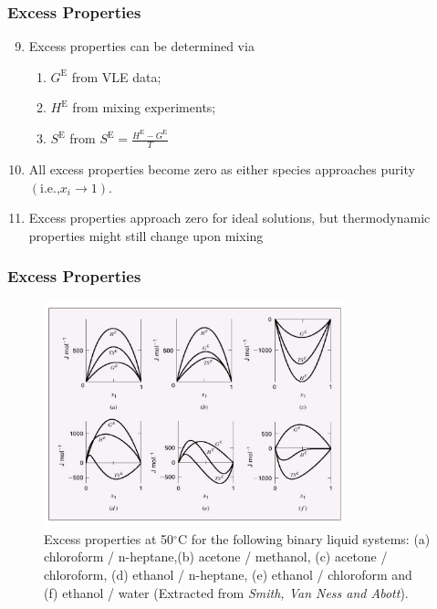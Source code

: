 \documentclass[10pt,compress,handout]{beamer}
\newcommand{\frc}{\displaystyle\frac}
\begin{document}
\begin{frame}
  \frametitle{Excess Properties}
  \begin{enumerate}\setcounter{enumi}{8}
      \item<1-> Excess properties can be determined via
         \begin{enumerate}
            \item<1-> $G^{\text{E}}$ from VLE data;
            \item<1-> $H^{\text{E}}$ from mixing experiments;
            \item<1-> $S^{\text{E}}$ from $S^{\text{E}}=\frc{H^{\text{E}}-G^{\text{E}}}{T}$
         \end{enumerate}
      \item<2-> All excess properties become zero as either species approaches purity $\left(\text{i.e.,} x_{i}\rightarrow 1\right)$.
      \item<3-> Excess properties approach zero for ideal solutions, but thermodynamic properties might still change upon mixing
  \end{enumerate}
\end{frame}
\normalsize

\scriptsize
\begin{frame}
  \frametitle{Excess Properties}
     \begin{center}
       \begin{figure}
         \includegraphics[width=9.cm, height=6.5cm,clip]{./Pics/ExcessProperties_Plot}
          \caption{\scriptsize Excess properties at 50$^{\circ}$C for the following binary liquid systems: (a) chloroform / n-heptane,(b) acetone / methanol, (c) acetone / chloroform, (d) ethanol / n-heptane, (e) ethanol / chloroform and (f) ethanol / water (Extracted from {\it Smith, Van Ness and Abott}). }
       \end{figure}
     \end{center}
\end{frame}
\normalsize
\end{document}
